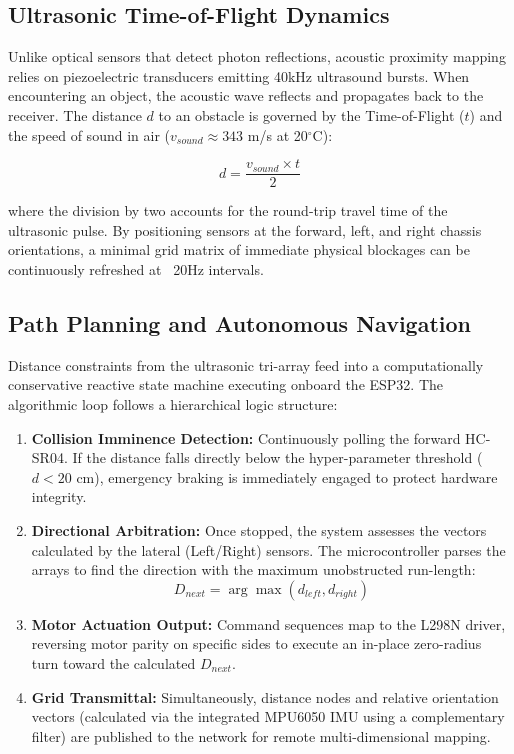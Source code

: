 \documentclass[conference]{IEEEtran}
\begin{document}
\subsection{Ultrasonic Time-of-Flight Dynamics}
Unlike optical sensors that detect photon reflections, acoustic proximity mapping relies on piezoelectric transducers emitting 40kHz ultrasound bursts. When encountering an object, the acoustic wave reflects and propagates back to the receiver. The distance $d$ to an obstacle is governed by the Time-of-Flight ($t$) and the speed of sound in air ($v_{sound} \approx 343$ m/s at 20$^\circ$C):

\begin{equation}
    d = \frac{v_{sound} \times t}{2}
\end{equation}

where the division by two accounts for the round-trip travel time of the ultrasonic pulse. By positioning sensors at the forward, left, and right chassis orientations, a minimal grid matrix of immediate physical blockages can be continuously refreshed at ~20Hz intervals.

\subsection{Path Planning and Autonomous Navigation}
Distance constraints from the ultrasonic tri-array feed into a computationally conservative reactive state machine executing onboard the ESP32. The algorithmic loop follows a hierarchical logic structure:
\begin{enumerate}
    \item \textbf{Collision Imminence Detection:} Continuously polling the forward HC-SR04. If the distance falls directly below the hyper-parameter threshold ($d < 20$ cm), emergency braking is immediately engaged to protect hardware integrity.
    \item \textbf{Directional Arbitration:} Once stopped, the system assesses the vectors calculated by the lateral (Left/Right) sensors. The microcontroller parses the arrays to find the direction with the maximum unobstructed run-length:
    $$ D_{next} = \arg\max (d_{left}, d_{right}) $$
    \item \textbf{Motor Actuation Output:} Command sequences map to the L298N driver, reversing motor parity on specific sides to execute an in-place zero-radius turn toward the calculated $D_{next}$.
    \item \textbf{Grid Transmittal:} Simultaneously, distance nodes and relative orientation vectors (calculated via the integrated MPU6050 IMU using a complementary filter) are published to the network for remote multi-dimensional mapping.
\end{enumerate}
\end{document}
